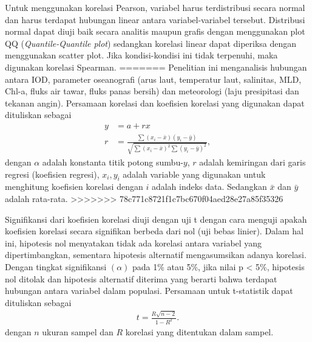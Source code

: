 \begin{spacing}{1.5}
		Untuk menggunakan korelasi Pearson, variabel harus terdistribusi secara normal dan harus terdapat hubungan linear antara variabel-variabel tersebut. Distribusi normal dapat diuji baik secara analitis maupun grafis dengan menggunakan plot QQ (\textit{Quantile-Quantile plot}) sedangkan korelasi linear dapat diperiksa dengan menggunakan scatter plot. Jika kondisi-kondisi ini tidak terpenuhi, maka digunakan korelasi Spearman.
=======
		Penelitian ini menganalisis hubungan antara IOD, parameter oseanografi (arus laut, temperatur laut, salinitas, MLD, Chl-a, fluks air tawar, fluks panas bersih) dan meteorologi (laju presipitasi dan tekanan angin). Persamaan korelasi dan koefisien korelasi yang digunakan dapat dituliskan sebagai \cite{Haditiar2020}
		\begin{equation}
			\begin{aligned}
				y &= a+rx\\
				r &= \frac{\sum (x_i - \bar{x})(y_i - \bar{y})}{\sqrt{\sum (x_i-\bar{x})^2\sum (y_i-\bar{y})^2}},
			\end{aligned}
		\end{equation}
		dengan $\alpha$ adalah konstanta titik potong sumbu-$y$, $r$ adalah kemiringan dari garis regresi (koefisien regresi), $x_i, y_i$ adalah variable yang digunakan untuk menghitung koefisien korelasi dengan $i$ adalah indeks data. Sedangkan $\bar{x}$ dan $\bar{y}$ adalah rata-rata. 
>>>>>>> 78c771c8721f1c7bc670f04aed28e27a85f35326
		
		Signifikansi dari koefisien korelasi diuji dengan uji t dengan cara menguji apakah koefisien korelasi secara signifikan berbeda dari nol (uji bebas linier). Dalam hal ini, hipotesis nol menyatakan tidak ada korelasi antara variabel yang dipertimbangkan, sementara hipotesis alternatif mengasumsikan adanya korelasi. Dengan tingkat signifikansi $(\alpha)$ pada 1\% atau 5\%, jika nilai p < 5\%, hipotesis nol ditolak dan hipotesis alternatif diterima yang berarti bahwa terdapat hubungan antara variabel dalam populasi. Persamaan untuk t-statistik dapat dituliskan sebagai
		\begin{equation}
			\begin{aligned}
				t=\frac{R\sqrt{n-2}}{1-R^2}.
			\end{aligned}
		\end{equation}
		dengan $n$ ukuran sampel dan $R$ korelasi yang ditentukan dalam sampel.

\end{spacing}
